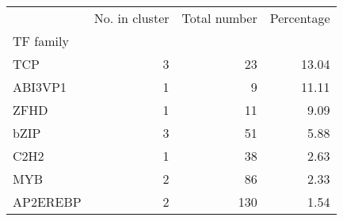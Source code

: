 \begin{tabular}{lrrr}
\toprule
{} &  No. in cluster &  Total number &  Percentage \\
TF family &                 &               &             \\
\midrule
TCP       &               3 &            23 &       13.04 \\
ABI3VP1   &               1 &             9 &       11.11 \\
ZFHD      &               1 &            11 &        9.09 \\
bZIP      &               3 &            51 &        5.88 \\
C2H2      &               1 &            38 &        2.63 \\
MYB       &               2 &            86 &        2.33 \\
AP2EREBP  &               2 &           130 &        1.54 \\
\bottomrule
\end{tabular}
